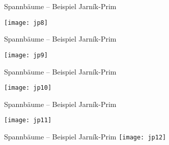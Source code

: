 \begin{frame}{Spannbäume – Beispiel Jarník-Prim}
	
		\centering
		\texttt{[image: jp8]}
	
\end{frame}

\begin{frame}{Spannbäume – Beispiel Jarník-Prim}
	
		\centering
		\texttt{[image: jp9]}
	
\end{frame}

\begin{frame}{Spannbäume – Beispiel Jarník-Prim}
	
		\centering
		\texttt{[image: jp10]}
	
\end{frame}

\begin{frame}{Spannbäume – Beispiel Jarník-Prim}
	
		\centering
		\texttt{[image: jp11]}
	
\end{frame}

\begin{frame}{{\hypertarget{label:afterEx1}{}Spannbäume – Beispiel Jarník-Prim}}
		\centering
		\texttt{[image: jp12]}
\end{frame}